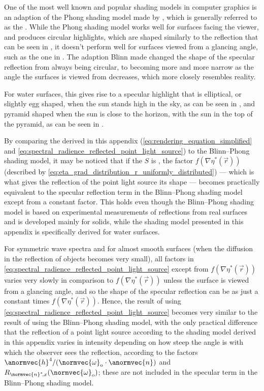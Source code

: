 One of the most well known and popular shading models in computer graphics is an adaption of the Phong shading model \citep{Phong1975} made by \citet{Blinn1977}, which is generally referred to as the . While the Phong shading model works well for surfaces facing the viewer, and produces circular highlights, which are shaped similarly to the reflection that can be seen in , it doesn't perform well for surfaces viewed from a glancing angle, such as the one in . The adaption Blinn made changed the shape of the specular reflection from always being circular, to becoming more and more narrow as the angle the surfaces is viewed from decreases, which more closely resembles reality.

For water surfaces, this gives rise to a specular highlight that is elliptical, or slightly egg shaped, when the sun stands high in the sky, as can be seen in , and pyramid shaped when the sun is close to the horizon, with the sun in the top of the pyramid, as can be seen in .

By comparing the  derived in this appendix ( \ref{eq:rendering_equation_simplified} and \ref{eq:spectral_radience_reflected_point_light_source}) to the Blinn--Phong shading model, it may be noticed that if the  $S$ is , the factor $f(\nabla\eta^*(\vec{r}))$ (described by \eqref{eq:eta_grad_distribution_r_uniformly_distributed}) --- which is what gives the reflection of the point light source its shape --- becomes practically equivalent to the specular reflection term in the Blinn--Phong shading model except from a constant factor. This holds even though the Blinn--Phong shading model is based on experimental measurements of reflections from real surfaces and is developed mainly for solids, while the shading model presented in this appendix is specifically derived for water surfaces.

For symmetric wave spectra and for almost smooth surfaces (when the diffusion in the reflection of objects becomes very small), all factors in \eqref{eq:spectral_radience_reflected_point_light_source} except from $f(\nabla\eta^*(\vec{r}))$ varies very slowly in comparison to $f(\nabla\eta^*(\vec{r}))$ unless the surface is viewed from a glancing angle, and so the shape of the specular reflection can be \approximated as just a constant times $f(\nabla\eta^*(\vec{r}))$. Hence, the result of using \eqref{eq:spectral_radience_reflected_point_light_source} becomes very similar to the result of using the Blinn--Phong shading model, with the only practical difference that the reflection of a point light source according to the shading model derived in this appendix varies in intensity depending on how steep the angle is with which the observer sees the reflection, according to the factors $\anormvec{h}^4/(\normvec{\omega}_{\text{o}}\cdot\anormvec{n})$ and $R_{\normvec{n}^*\!,x}(\normvec{\omega}_{\text{o}})$; these are not included in the specular term in the Blinn--Phong shading model.

